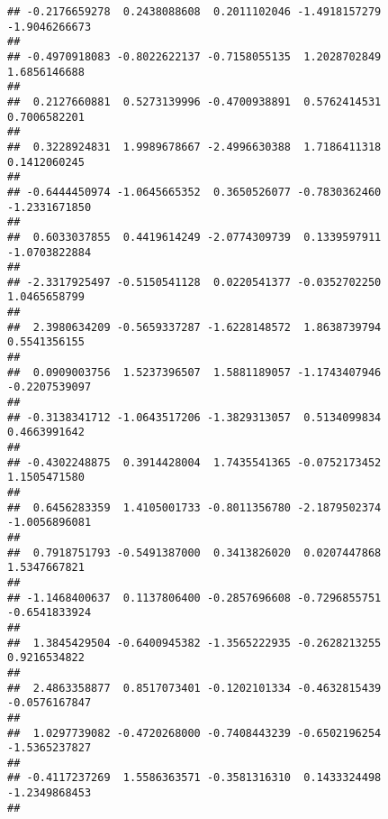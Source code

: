 \documentclass[]{article}
\begin{document}
\begin{verbatim}
## -0.2176659278  0.2438088608  0.2011102046 -1.4918157279 -1.9046266673 
##                                                                       
## -0.4970918083 -0.8022622137 -0.7158055135  1.2028702849  1.6856146688 
##                                                                       
##  0.2127660881  0.5273139996 -0.4700938891  0.5762414531  0.7006582201 
##                                                                       
##  0.3228924831  1.9989678667 -2.4996630388  1.7186411318  0.1412060245 
##                                                                       
## -0.6444450974 -1.0645665352  0.3650526077 -0.7830362460 -1.2331671850 
##                                                                       
##  0.6033037855  0.4419614249 -2.0774309739  0.1339597911 -1.0703822884 
##                                                                       
## -2.3317925497 -0.5150541128  0.0220541377 -0.0352702250  1.0465658799 
##                                                                       
##  2.3980634209 -0.5659337287 -1.6228148572  1.8638739794  0.5541356155 
##                                                                       
##  0.0909003756  1.5237396507  1.5881189057 -1.1743407946 -0.2207539097 
##                                                                       
## -0.3138341712 -1.0643517206 -1.3829313057  0.5134099834  0.4663991642 
##                                                                       
## -0.4302248875  0.3914428004  1.7435541365 -0.0752173452  1.1505471580 
##                                                                       
##  0.6456283359  1.4105001733 -0.8011356780 -2.1879502374 -1.0056896081 
##                                                                       
##  0.7918751793 -0.5491387000  0.3413826020  0.0207447868  1.5347667821 
##                                                                       
## -1.1468400637  0.1137806400 -0.2857696608 -0.7296855751 -0.6541833924 
##                                                                       
##  1.3845429504 -0.6400945382 -1.3565222935 -0.2628213255  0.9216534822 
##                                                                       
##  2.4863358877  0.8517073401 -0.1202101334 -0.4632815439 -0.0576167847 
##                                                                       
##  1.0297739082 -0.4720268000 -0.7408443239 -0.6502196254 -1.5365237827 
##                                                                       
## -0.4117237269  1.5586363571 -0.3581316310  0.1433324498 -1.2349868453 
##                                                                       

\end{verbatim}
\end{document}
